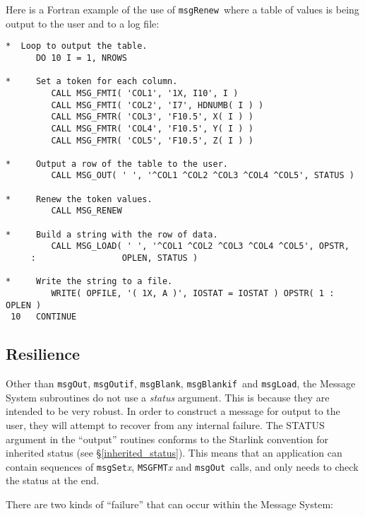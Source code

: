 \documentclass[twoside,11pt]{article}
\newcommand{\htmlref}[2]{#1}
\newcommand{\latex}[1]{#1}
\newcommand{\xlabel}[1]{}
\renewcommand{\_}{\texttt{\symbol{95}}}
\newcommand{\func}[1]{\texttt{#1}}
\newcommand{\farg}[1]{\textit{#1}}
\newcommand{\msgblank}{\func{msgBlank}}
\newcommand{\msgblankif}{\func{msgBlankif}}
\newcommand{\msgload}{\func{msgLoad}}
\newcommand{\msgout}{\func{msgOut}}
\newcommand{\msgoutif}{\func{msgOutif}}
\newcommand{\msgrenew}{\func{msgRenew}}
\begin{document}
Here is a Fortran example of the use of \msgrenew\ where a table of values is being
output to the user and to a log file:

\begin {small}
\begin{verbatim}
*  Loop to output the table.
      DO 10 I = 1, NROWS

*     Set a token for each column.
         CALL MSG_FMTI( 'COL1', '1X, I10', I )
         CALL MSG_FMTI( 'COL2', 'I7', HDNUMB( I ) )
         CALL MSG_FMTR( 'COL3', 'F10.5', X( I ) )
         CALL MSG_FMTR( 'COL4', 'F10.5', Y( I ) )
         CALL MSG_FMTR( 'COL5', 'F10.5', Z( I ) )

*     Output a row of the table to the user.
         CALL MSG_OUT( ' ', '^COL1 ^COL2 ^COL3 ^COL4 ^COL5', STATUS )

*     Renew the token values.
         CALL MSG_RENEW

*     Build a string with the row of data.
         CALL MSG_LOAD( ' ', '^COL1 ^COL2 ^COL3 ^COL4 ^COL5', OPSTR,
     :                 OPLEN, STATUS )

*     Write the string to a file.
         WRITE( OPFILE, '( 1X, A )', IOSTAT = IOSTAT ) OPSTR( 1 : OPLEN )
 10   CONTINUE
\end{verbatim}
\end {small}


\subsection{\xlabel{resilience}Resilience}

Other than \msgout, \msgoutif, \msgblank, \msgblankif\ and \msgload, the Message System
subroutines do not use a \farg{status} argument.
This is because they are intended to be very robust.
In order to construct a message for output to the user, they will attempt to
recover from any internal failure.
The STATUS argument in the ``output'' routines conforms to the Starlink
convention for
\htmlref
{inherited status}{inherited_status}\latex{ (see \S\ref{inherited_status})}.
This means that an application can contain sequences of \func{msgSet}\textit{x},
\func{MSG\_FMT}\textit{x} and \msgout\ calls, and only needs to check the status at the
end.

There are two kinds of ``failure'' that can occur within the Message
System:
\end{document}

